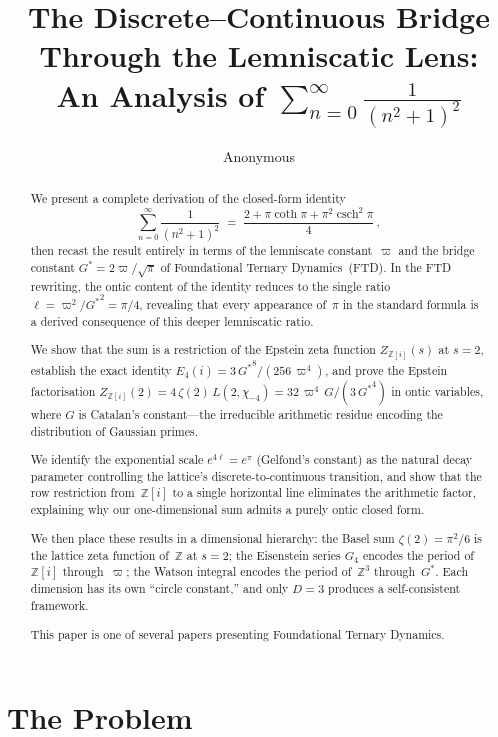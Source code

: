 \documentclass[12pt]{article}
\title{The Discrete--Continuous Bridge Through the Lemniscatic Lens:\\[6pt]
\large An Analysis of $\displaystyle\sum_{n=0}^{\infty}\frac{1}{(n^2+1)^2}$}
\author{Anonymous}
\date{}
\newcommand{\Z}{\mathbb{Z}}
\DeclareMathOperator{\csch}{csch}
\begin{document}
\maketitle

\begin{abstract}
We present a complete derivation of the closed-form identity
\[
\sum_{n=0}^{\infty}\frac{1}{(n^2+1)^2}
\;=\;\frac{2+\pi\coth\pi+\pi^2\csch^2\pi}{4}\,,
\]
then recast the result entirely in terms of the lemniscate constant~$\varpi$
and the bridge constant ${G^{*}}=2\varpi/\sqrt{\pi}$ of Foundational Ternary
Dynamics~(FTD).  In the FTD rewriting, the ontic content of the identity
reduces to the single ratio $\ell=\varpi^2/{G^{*}}^2=\pi/4$, revealing
that every appearance of~$\pi$ in the standard formula is a derived
consequence of this deeper lemniscatic ratio.

We show that the sum is a restriction of the Epstein zeta function
$Z_{\Z[i]}(s)$ at $s=2$, establish the exact identity
$E_4(i)=3\,{G^{*}}^8/(256\,\varpi^4)$, and prove the Epstein factorisation
$Z_{\Z[i]}(2)=4\,\zeta(2)\,L(2,\chi_{-4})=32\,\varpi^4\,G/(3\,{G^{*}}^4)$
in ontic variables, where $G$ is Catalan's constant---the irreducible
arithmetic residue encoding the distribution of Gaussian primes.

We identify the exponential scale $e^{4\ell}=e^{\pi}$ (Gelfond's
constant) as the natural decay parameter controlling the lattice's
discrete-to-continuous transition, and show that the row restriction
from~$\Z[i]$ to a single horizontal line eliminates the arithmetic factor,
explaining why our one-dimensional sum admits a purely ontic closed form.

We then place these results in a dimensional hierarchy: the Basel sum
$\zeta(2) = \pi^2/6$ is the lattice zeta function of~$\Z$ at $s = 2$;
the Eisenstein series $G_4$ encodes the period of~$\Z[i]$ through~$\varpi$;
the Watson integral encodes the period of~$\Z^3$ through~${G^{*}}$.
Each dimension has its own ``circle constant,'' and only $D = 3$
produces a self-consistent framework.

This paper is one of several papers presenting Foundational Ternary
Dynamics.
\end{abstract}

\tableofcontents

\section{The Problem}
\end{document}

